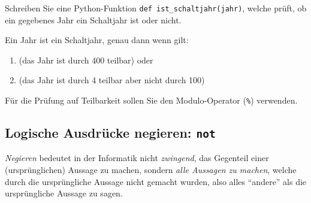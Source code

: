 \begin{mychallenge}
	Schreiben Sie eine Python-Funktion \lstinline|def ist_schaltjahr(jahr)|, welche prüft, ob ein gegebenes Jahr ein Schaltjahr ist oder nicht.

	Ein Jahr ist ein Schaltjahr, genau dann wenn gilt:
	\begin{enumerate}
		\item (das Jahr ist durch 400 teilbar) oder
		\item (das Jahr ist durch 4 teilbar aber nicht durch 100)
	\end{enumerate}
	Für die Prüfung auf Teilbarkeit sollen Sie den Modulo-Operator (\lstinline|%|) verwenden.
	\begin{myanswer}
		
	\end{myanswer}
\end{mychallenge}

\subsection{Logische Ausdrücke negieren: \texorpdfstring{\lstinline|not|}{not}}
\textit{Negieren} bedeutet in der Informatik nicht \textit{zwingend}, das Gegenteil einer (ursprünglichen) Aussage zu machen, sondern \textit{alle Aussagen zu machen}, welche durch die ursprüngliche Aussage nicht gemacht wurden, also alles \enquote{andere} als die ursprüngliche Aussage zu sagen.

